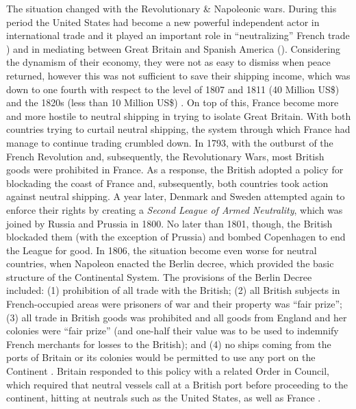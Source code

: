 \documentclass[12pt,a4paper,notitlepage,english]{article}
\begin{document}
The situation changed with the Revolutionary \& Napoleonic wars. During this period 
the United States had become a new powerful independent actor in international trade and it played an important role in ``neutralizing'' French trade \citep{Marzagalli2005,Marzagalli2015}) and in mediating between Great Britain and Spanish America (\cite{Cuenca-Esteban2014}).
Considering the dynamism of their economy, they were not as easy to dismiss when peace returned, however this was not sufficient to save their shipping income, which was down to one fourth with respect to the level of 1807 and 1811 (40 Million US\$) and the 1820s (less than 10 Million US\$) \citep[tables A-4 and B-2]{North1960}.
On top of this, France become more and more hostile to neutral shipping in trying to isolate Great Britain. With both countries trying to curtail neutral shipping, the system through which France had manage to continue trading crumbled down. 
In 1793, with the outburst of the French Revolution and, subsequently, the Revolutionary Wars, most British goods were prohibited in France.
As a response, the British adopted a policy for blockading the coast of France and, subsequently, both countries took action against neutral shipping.
A year later, Denmark and Sweden attempted again to enforce their rights by creating a \textit{Second League of Armed Neutrality}, which was joined by Russia and Prussia in 1800.
No later than 1801, though, the British blockaded them (with the exception of Prussia) and bombed Copenhagen to end the League for good.
In 1806, the situation become even worse for neutral countries, when Napoleon enacted the Berlin decree, which provided the basic structure of the Continental System.
The provisions of the Berlin Decree included: (1) prohibition of all trade with the British; (2) all British subjects in French-occupied areas were prisoners of war and their property was ``fair prize''; (3) all trade in British goods was prohibited and all goods from England and her colonies were ``fair prize'' (and one-half their value was to be used to indemnify French merchants for losses to the British); and (4) no ships coming from the ports of Britain or its colonies would be permitted to use any port on the Continent \citep{Davis2006}.
Britain responded to this policy with a related Order in Council, which required that neutral vessels call at a British port before proceeding to the continent, hitting at neutrals such as the United States, as well as France \citep{Davis2006}.
\end{document}
